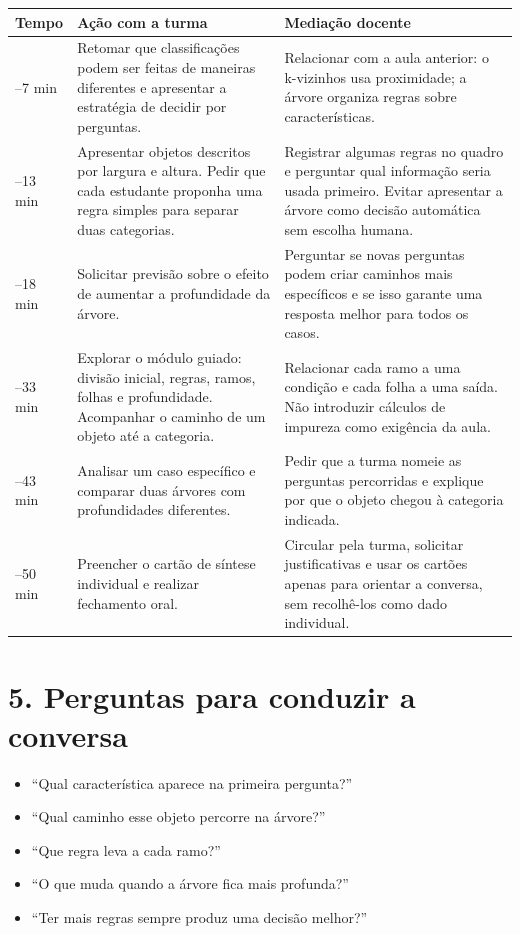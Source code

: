 \documentclass[12pt,a4paper]{article}
\begin{document}
\renewcommand{\arraystretch}{1.22}
\begin{tabularx}{\linewidth}{|>{\centering\arraybackslash}p{1.65cm}|p{5.0cm}|X|}
\hline
\textbf{Tempo} & \textbf{Ação com a turma} & \textbf{Mediação docente} \\
\hline
0--7 min & Retomar que classificações podem ser feitas de maneiras diferentes e apresentar a estratégia de decidir por perguntas. & Relacionar com a aula anterior: o k-vizinhos usa proximidade; a árvore organiza regras sobre características. \\
\hline
7--13 min & Apresentar objetos descritos por largura e altura. Pedir que cada estudante proponha uma regra simples para separar duas categorias. & Registrar algumas regras no quadro e perguntar qual informação seria usada primeiro. Evitar apresentar a árvore como decisão automática sem escolha humana. \\
\hline
13--18 min & Solicitar previsão sobre o efeito de aumentar a profundidade da árvore. & Perguntar se novas perguntas podem criar caminhos mais específicos e se isso garante uma resposta melhor para todos os casos. \\
\hline
18--33 min & Explorar o módulo guiado: divisão inicial, regras, ramos, folhas e profundidade. Acompanhar o caminho de um objeto até a categoria. & Relacionar cada ramo a uma condição e cada folha a uma saída. Não introduzir cálculos de impureza como exigência da aula. \\
\hline
33--43 min & Analisar um caso específico e comparar duas árvores com profundidades diferentes. & Pedir que a turma nomeie as perguntas percorridas e explique por que o objeto chegou à categoria indicada. \\
\hline
43--50 min & Preencher o cartão de síntese individual e realizar fechamento oral. & Circular pela turma, solicitar justificativas e usar os cartões apenas para orientar a conversa, sem recolhê-los como dado individual. \\
\hline
\end{tabularx}

\section*{5. Perguntas para conduzir a conversa}

\begin{itemize}
  \item ``Qual característica aparece na primeira pergunta?''
  \item ``Qual caminho esse objeto percorre na árvore?''
  \item ``Que regra leva a cada ramo?''
  \item ``O que muda quando a árvore fica mais profunda?''
  \item ``Ter mais regras sempre produz uma decisão melhor?''
\end{itemize}
\end{document}
